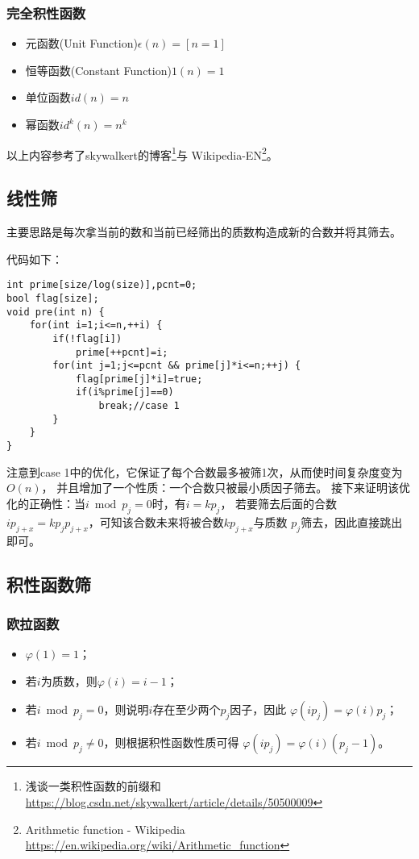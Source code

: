 \subsubsection{完全积性函数}
\begin{itemize}
	\item {}
	      元函数(Unit Function)$\epsilon(n)=[n=1]$
	\item {}
		恒等函数(Constant Function)$1(n)=1$
	\item 单位函数$id(n)=n$
	\item 幂函数$id^k(n)=n^k$
\end{itemize}
以上内容参考了skywalkert的博客\footnote{浅谈一类积性函数的前缀和\\
	\url{https://blog.csdn.net/skywalkert/article/details/50500009}}与
Wikipedia-EN\footnote{Arithmetic function - Wikipedia
	\url{https://en.wikipedia.org/wiki/Arithmetic\_function}}。
\subsection{线性筛}
主要思路是每次拿当前的数和当前已经筛出的质数构造成新的合数并将其筛去。

代码如下：
\begin{lstlisting}[title=Euler]
int prime[size/log(size)],pcnt=0;
bool flag[size];
void pre(int n) {
    for(int i=1;i<=n,++i) {
        if(!flag[i])
            prime[++pcnt]=i;
        for(int j=1;j<=pcnt && prime[j]*i<=n;++j) {
            flag[prime[j]*i]=true;
            if(i%prime[j]==0)
                break;//case 1
        }
    }
}
\end{lstlisting}
注意到case 1中的优化，它保证了每个合数最多被筛1次，从而使时间复杂度变为$O(n)$，
并且增加了一个性质：一个合数只被最小质因子筛去。
接下来证明该优化的正确性：当$i\bmod p_j=0$时，有$i=kp_j$，
若要筛去后面的合数$ip_{j+x}=kp_jp_{j+x}$，可知该合数未来将被合数$kp_{j+x}$与质数
$p_j$筛去，因此直接跳出即可。
\subsection{积性函数筛}
\subsubsection{欧拉函数}
\begin{itemize}
	\item $\varphi(1)=1$；
	\item 若$i$为质数，则$\varphi(i)=i-1$；
	\item 若$i \bmod p_j=0$，则说明$i$存在至少两个$p_j$因子，因此
	      $\varphi(ip_j)=\varphi(i)p_j$；
	\item 若$i \bmod p_j\neq 0$，则根据积性函数性质可得
	      $\varphi(ip_j)=\varphi(i)(p_j-1)$。
\end{itemize}
